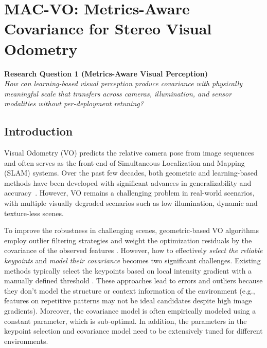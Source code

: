 \chapter{MAC-VO: Metrics-Aware Covariance for Stereo Visual Odometry} \label{chapter:macvo}

\begin{framed}
    \centering
    \textbf{Research Question 1 (Metrics-Aware Visual Perception)} \\
    \textit{How can learning-based visual perception produce covariance with physically meaningful scale that transfers across cameras, illumination, and sensor modalities without per-deployment retuning?}
\end{framed}

\section{Introduction}
Visual Odometry (VO) predicts the relative camera pose from image sequences and often serves as the front-end of Simultaneous Localization and Mapping (SLAM) systems. 
Over the past few decades, both geometric and learning-based methods have been developed with significant advances in generalizability and accuracy~\cite{mur2015orb,tartanvo2020corl,teed2021droid,teed2024deep}.
However, VO remains a challenging problem in real-world scenarios, with multiple visually degraded scenarios such as low illumination, dynamic and texture-less scenes.


To improve the robustness in challenging scenes, geometric-based VO algorithms employ outlier filtering strategies \cite{fischler1981random} and weight the optimization residuals by the covariance of the observed features \cite{zhao2021super}.
However, how to effectively \textit{select the reliable keypoints} and \textit{model their covariance} becomes two significant challenges. 
Existing methods typically select the keypoints based on local intensity gradient with a manually defined threshold \cite{superpoint2018, orb2011, sift2004}. 
These approaches lead to errors and outliers because they don't model the structure or context information of the environment (e.g., features on repetitive patterns may not be ideal candidates despite high image gradients). 
Moreover, the covariance model is often empirically modeled using a constant parameter, which is sub-optimal. 
In addition, the parameters in the keypoint selection and covariance model need to be extensively tuned for different environments. 


